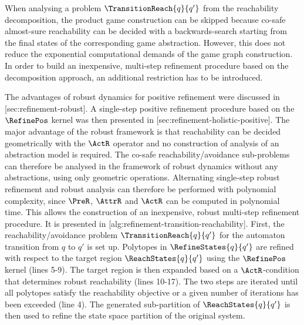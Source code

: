 \startsubsection[title={Robust Reachability Refinement},reference=sec:refinement-transition-reachability]


    When analysing a problem $\TransitionReach{q}{q'}$ from the reachability decomposition, the product game construction can be skipped because co-safe almost-sure reachability can be decided with a backwards-search starting from the final states of the corresponding game abstraction.
    However, this does not reduce the exponential computational demands of the game graph construction.
    In order to build an inexpensive, multi-step refinement procedure based on the decomposition approach, an additional restriction has to be introduced.

    The advantages of robust dynamics for positive refinement were discussed in [sec:refinement-robust].
    A single-step positive refinement procedure based on the $\RefinePos$ kernel was then presented in [sec:refinement-holistic-positive].
    The major advantage of the robust framework is that reachability can be decided geometrically with the $\ActR$ operator and no construction of analysis of an abstraction model is required.
    The co-safe reachability/avoidance sub-problems can therefore be analysed in the framework of robust dynamics without any abstractions, using only geometric operations.
    Alternating single-step robust refinement and robust analysis can therefore be performed with polynomial complexity, since $\PreR$, $\AttrR$ and $\ActR$ can be computed in polynomial time.
    This allows the construction of an inexpensive, robust multi-step refinement procedure.
    It is presented in [alg:refinement-transition-reachability].
    First, the reachability/avoidance problem $\TransitionReach{q}{q'}$ for the automaton transition from $q$ to $q'$ is set up.
    Polytopes in $\RefineStates{q}{q'}$ are refined with respect to the target region $\ReachStates{q}{q'}$ using the $\RefinePos$ kernel (lines 5-9).
    The target region is then expanded based on a $\ActR$-condition that determines robust reachability (lines 10-17).
    The two steps are iterated until all polytopes satisfy the reachability objective or a given number of iterations has been exceeded (line 4).
    The generated sub-partition of $\ReachStates{q}{q'}$ is then used to refine the state space partition of the original system.

